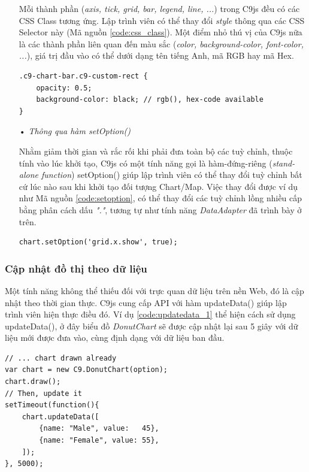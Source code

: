 \documentclass[12pt,a4paper,twoside]{article}
\begin{document}
\begin{itemize}
Mỗi thành phần (\textit{axis, tick, grid, bar, legend, line, ...}) trong C9js đều có các CSS Class\citep{css_class} tương ứng. Lập trình viên có thể thay đổi \textit{style} thông qua các CSS Selector này (Mã nguồn \ref{code:css_class}). Một điểm nhỏ thú vị của C9js nữa là các thành phần liên quan đến màu sắc (\textit{color, background-color, font-color, ...}), giá trị đầu vào có thể dưới dạng tên tiếng Anh, mã RGB hay mã Hex.

\begin{lstlisting}[caption=Thay đổi \textit{style} bằng CSS Selector, label={code:css_class}]
.c9-chart-bar.c9-custom-rect {
    opacity: 0.5;
    background-color: black; // rgb(), hex-code available
}
\end{lstlisting}

\item[•] \emph{Thông qua hàm \textsf{setOption()}}

Nhằm giảm thời gian và rắc rối khi phải đưa toàn bộ các tuỳ chỉnh, thuộc tính vào lúc khởi tạo, C9js có một tính năng gọi là hàm-đứng-riêng (\textit{stand-alone function}) \textsf{setOption()} giúp lập trình viên có thể thay đổi tuỳ chỉnh bất cứ lúc nào sau khi khởi tạo đối tượng Chart/Map. Việc thay đổi được ví dụ như Mã nguồn \ref{code:setoption}, có thể thay đổi các tuỳ chỉnh lồng nhiều cấp bằng phân cách dấu \textit{"."}, tương tự như tính năng \textit{DataAdapter} đã trình bày ở trên.

\begin{lstlisting}[caption=Thay đổi \textit{style} với \textsf{setOption()}, label={code:setoption}]
chart.setOption('grid.x.show', true);
\end{lstlisting}

\end{itemize}

\subsubsection{Cập nhật đồ thị theo dữ liệu}
Một tính năng không thể thiếu đối với trực quan dữ liệu trên nền Web, đó là cập nhật theo thời gian thực. C9js cung cấp API với hàm \textsf{updateData()} giúp lập trình viên hiện thực điều đó. Ví dụ \ref{code:updatedata_1} thể hiện cách sử dụng \textsf{updateData()}, ở đây biểu đồ \textit{DonutChart} sẽ được cập nhật lại sau 5 giây với dữ liệu mới được đưa vào, cùng định dạng với dữ liệu ban đầu.

\begin{lstlisting}[caption=Cập nhật lại biểu đồ với \textit{updateData}, label={code:updatedata_1}]
// ... chart drawn already
var chart = new C9.DonutChart(option);
chart.draw();
// Then, update it
setTimeout(function(){
    chart.updateData([
        {name: "Male", value:   45},
        {name: "Female", value: 55},
    ]);
}, 5000);
\end{lstlisting}
\end{document}
